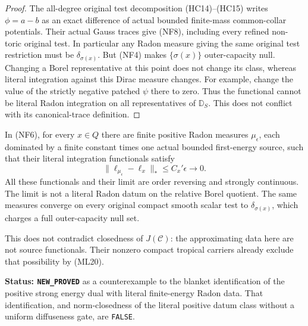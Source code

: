 \begin{proof}
The all-degree original test decomposition (HC14)--(HC15)
writes $\phi=a-b$ as an exact difference of actual bounded
finite-mass common-collar potentials. Their actual Gauss
traces give (NF8), including every refined non-toric original
test. In particular any Radon measure giving the same
original test restriction must be $\delta_{\sigma(x)}$.
But (NF4) makes $\{\sigma(x)\}$ outer-capacity null.
Changing a Borel representative at this point does not
change its class, whereas literal integration against this
Dirac measure changes. For example, change the value of
the strictly negative patched $\psi$ there to zero.
Thus the functional cannot be literal Radon integration
on all representatives of $\mathbb D_S$. This does not
conflict with its canonical-trace definition.
\end{proof}

\begin{theorem}
\label{thm:r12-literal-dual-data-not-closed}
In (NF6), for every $x\in Q$ there are finite positive Radon
measures $\mu_\epsilon$, each dominated by a finite constant
times one actual bounded first-energy source, such that
their literal integration functionals satisfy
\[
               \|\ell_{\mu_\epsilon}-\ell_x\|_*
                                      \leq C_x'\epsilon\longrightarrow0.
 \tag{NF12}
\]
All these functionals and their limit are order reversing
and strongly continuous. The limit is not a literal Radon
datum on the relative Borel quotient. The same measures
converge on every original compact smooth scalar test to
$\delta_{\sigma(x)}$, which charges a full outer-capacity
null set.

This does not contradict closedness of $J(\mathscr C)$:
the approximating data here are not source functionals.
Their nonzero compact tropical carriers already exclude
that possibility by (ML20).
\end{theorem}

\noindent\textbf{Status: \texttt{NEW\_PROVED}} as a
counterexample to the blanket identification of the positive
strong energy dual with literal finite-energy Radon data.
That identification, and norm-closedness of the literal
positive datum class without a uniform diffuseness gate,
are \texttt{FALSE}.

